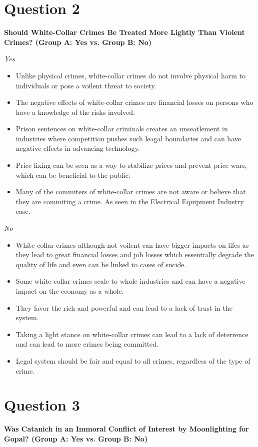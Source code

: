 \documentclass{article}
\begin{document}
\section*{Question 2}
\textbf{Should White-Collar Crimes Be Treated More Lightly Than Violent Crimes? (Group A: Yes vs. Group B: No)}

\textit{Yes}
\begin{itemize}
    \item Unlike physical crimes, white-collar crimes do not involve physical harm to individuals or pose a voilent threat to society.
    \item The negative effects of white-collar crimes are financial losses on persons who have a knowledge of the risks involved.
    \item Prison sentences on white-collar criminals creates an unseatlement in industries where competition pushes such leagal boundaries and can have negative effects in advancing technology.
    \item Price fixing can be seen as a way to stabilize prices and prevent price wars, which can be beneficial to the public.
    \item Many of the commiters of white-collar crimes are not aware or believe that they are commiting a crime. As seen in the Electrical Equipment Industry case.
\end{itemize}

\textit{No}
\begin{itemize}
    \item White-collar crimes although not voilent can have bigger impacts on lifes as they lead to great financial losses and job losses which essentially degrade the quality of life and even can be linked to cases of sucide.
    \item Some white collar crimes scale to whole industries and can have a negative impact on the economy as a whole.
    \item They favor the rich and powerful and can lead to a lack of trust in the system.
    \item Taking a light stance on white-collar crimes can lead to a lack of deterrence and can lead to more crimes being committed.
    \item Legal system should be fair and equal to all crimes, regardless of the type of crime.
\end{itemize}

\section*{Question 3}
\textbf{Was Catanich in an Immoral Conflict of Interest by Moonlighting for Gopal? (Group A: Yes vs. Group B: No)}
\end{document}
